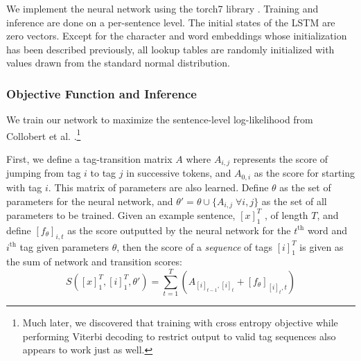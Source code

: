 \documentclass[11pt,letterpaper]{article}
\begin{document}
We implement the neural network using the torch7 library \cite{collobert2011torch7}. Training and inference are done on a per-sentence level. The initial states of the LSTM are zero vectors. Except for the character and word embeddings whose initialization has  been described previously, all lookup tables are randomly initialized with values drawn from the standard normal distribution. 

\subsubsection{Objective Function and Inference}

We train our network to maximize the sentence-level log-likelihood from Collobert et al. .\footnote{Much later, we discovered that training with cross entropy objective while performing Viterbi decoding to restrict output to valid tag sequences also appears to work just as well.}

First, we define a tag-transition matrix $A$ where $A_{i,j}$ represents the score of jumping from tag $i$ to tag $j$ in successive tokens, and $A_{0,i}$ as the score for starting with tag $i$. This matrix of parameters are also learned. Define $\theta$ as the set of parameters for the neural network, and $\theta' = \theta \cup \{A_{i,j} \; \forall i, j\}$ as the set of all parameters to be trained. Given an example sentence, $[x]_1^T$ , of length $T$, and define $[f_{\theta}]_{i,t}$ as the score outputted by the neural network for the $t^{\text{th}}$ word and $i^{\text{th}}$ tag given parameters $\theta$, then the score of a \emph{sequence} of tags $[i]_1^T$ is given as the sum of network and transition scores:
$$S([x]_1^T, [i]_1^T, \theta') = \sum_{t=1}^T \left ( A_{[i]_{t-1}, [i]_t} + [f_{\theta}]_{[i]_t, t} \right )$$
\end{document}
